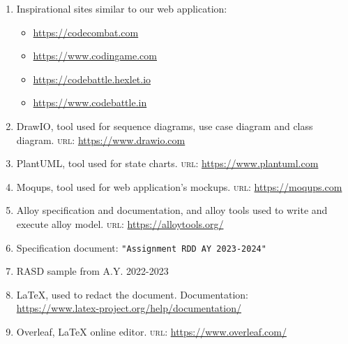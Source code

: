 
\begin{enumerate}
    \item Inspirational sites similar to our web application:
    \begin{itemize}
           \item \url{https://codecombat.com}
           \item \url{https://www.codingame.com}
           \item \url{https://codebattle.hexlet.io}
           \item \url{https://www.codebattle.in}
   \end{itemize}
    \item DrawIO, tool used for sequence diagrams, use case diagram and class diagram. \textsc{url}: \url{https://www.drawio.com}
    \item PlantUML, tool used for state charts. \textsc{url}: \url{https://www.plantuml.com}
    \item Moqups, tool used for web application's mockups. \textsc{url}: \url{https://moqups.com}
    \item Alloy specification and documentation, and alloy tools used to write and execute alloy model. \textsc{url}: \url{https://alloytools.org/}
    \item Specification document: \texttt{"Assignment RDD AY 2023-2024"}
    \item RASD sample from A.Y. 2022-2023
    \item \LaTeX, used to redact the document. Documentation:\\
   \url{https://www.latex-project.org/help/documentation/}
   \item Overleaf, \LaTeX \textbf{ }online editor. \textsc{url}:
   \url{https://www.overleaf.com/}
    
\end{enumerate}